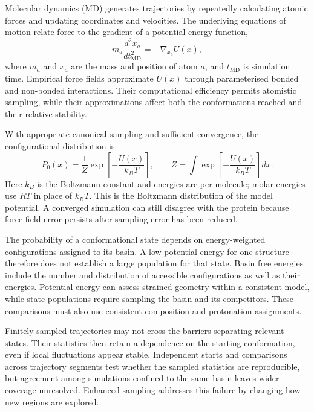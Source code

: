Molecular dynamics (MD) generates trajectories by repeatedly calculating atomic forces and updating coordinates and velocities. The underlying equations of motion relate force to the gradient of a potential energy function,
\begin{equation}
    m_a\frac{d^2x_a}{dt_{\text{MD}}^2}=-\nabla_{x_a}U(x),
    \label{eq:bg-newton}
\end{equation}
where $m_a$ and $x_a$ are the mass and position of atom $a$, and $t_{\text{MD}}$ is simulation time. Empirical force fields approximate $U(x)$ through parameterised bonded and non-bonded interactions. Their computational efficiency permits atomistic sampling, while their approximations affect both the conformations reached and their relative stability.\supercite{hollingsworthMolecularDynamicsSimulation2018}

With appropriate canonical sampling and sufficient convergence, the configurational distribution is
\begin{equation}
    P_0(x)=\frac{1}{Z}\exp\!\left[-\frac{U(x)}{k_BT}\right],
    \qquad Z=\int\exp\!\left[-\frac{U(x)}{k_BT}\right]dx.
    \label{eq:bg-boltzmann}
\end{equation}
Here $k_B$ is the Boltzmann constant and energies are per molecule; molar energies use $RT$ in place of $k_BT$. This is the Boltzmann distribution of the model potential.\supercite{bmsb2012ch3} A converged simulation can still disagree with the protein because force-field error persists after sampling error has been reduced.

The probability of a conformational state depends on energy-weighted configurations assigned to its basin. A low potential energy for one structure therefore does not establish a large population for that state. Basin free energies include the number and distribution of accessible configurations as well as their energies.\supercite{bmsb2012ch3} Potential energy can assess strained geometry within a consistent model, while state populations require sampling the basin and its competitors. These comparisons must also use consistent composition and protonation assignments.

Finitely sampled trajectories may not cross the barriers separating relevant states. Their statistics then retain a dependence on the starting conformation, even if local fluctuations appear stable.\supercite{hollingsworthMolecularDynamicsSimulation2018} Independent starts and comparisons across trajectory segments test whether the sampled statistics are reproducible, but agreement among simulations confined to the same basin leaves wider coverage unresolved. Enhanced sampling addresses this failure by changing how new regions are explored.

